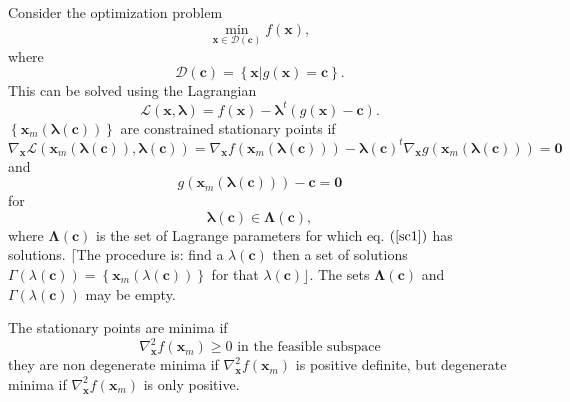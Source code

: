 \documentclass[aps,preprint]{revtex4}%
\begin{document}
Consider the optimization problem
\begin{equation}
\min_{\mathbf{x\in}\mathcal{D}\left(  \mathbf{c}\right)  }f\left(
\mathbf{x}\right)  ,
\end{equation}
where
\begin{equation}
\mathcal{D}\left(  \mathbf{c}\right)  \mathcal{=}\left\{  \mathbf{x}\left\vert
g\left(  \mathbf{x}\right)  =\mathbf{c}\right.  \right\}  .
\end{equation}
This can be solved using the Lagrangian
\begin{equation}
\mathcal{L}\left(  \mathbf{x,\lambda}\right)  =f\left(  \mathbf{x}\right)
-\mathbf{\lambda}^{t}\left(  g\left(  \mathbf{x}\right)  -\mathbf{c}\right)  .
\end{equation}
$\left\{  \mathbf{x}_{m}\left(  \mathbf{\lambda}\left(  \mathbf{c}\right)
\right)  \right\}  $ are constrained stationary points if
\begin{equation}
\nabla_{\mathbf{x}}\mathcal{L}\left(  \mathbf{x}_{m}\left(  \mathbf{\lambda
}\left(  \mathbf{c}\right)  \right)  \mathbf{,\lambda}\left(  \mathbf{c}%
\right)  \right)  =\nabla_{\mathbf{x}}f\left(  \mathbf{x}_{m}\left(
\mathbf{\lambda}\left(  \mathbf{c}\right)  \right)  \right)  -\mathbf{\lambda
}\left(  \mathbf{c}\right)  ^{t}\nabla_{\mathbf{x}}g\left(  \mathbf{x}%
_{m}\left(  \mathbf{\lambda}\left(  \mathbf{c}\right)  \right)  \right)
=\mathbf{0} \label{sc1}%
\end{equation}
and
\begin{equation}
g\left(  \mathbf{x}_{m}\left(  \mathbf{\lambda}\left(  \mathbf{c}\right)
\right)  \right)  -\mathbf{c=0}%
\end{equation}
for
\begin{equation}
\mathbf{\lambda}\left(  \mathbf{c}\right)  \mathbf{\in\Lambda}\left(
\mathbf{c}\right)  ,
\end{equation}
where $\mathbf{\Lambda}\left(  \mathbf{c}\right)  $ is the set of Lagrange
parameters for which eq. $\left(  \ref{sc1}\right)  $ has solutions. $\lceil
$The procedure is: find a $\lambda\left(  \mathbf{c}\right)  $ then a set of
solutions $\Gamma\left(  \lambda\left(  \mathbf{c}\right)  \right)  =\left\{
\mathbf{x}_{m}\left(  \lambda\left(  \mathbf{c}\right)  \right)  \right\}  $
for that $\lambda\left(  \mathbf{c}\right)  \rfloor$. The sets
$\mathbf{\Lambda}\left(  \mathbf{c}\right)  $ and $\Gamma\left(
\lambda\left(  \mathbf{c}\right)  \right)  $ may be empty.

The stationary points are minima if
\begin{equation}
\nabla_{\mathbf{x}}^{2}f\left(  \mathbf{x}_{m}\right)  \geq0\text{ in the
feasible subspace}%
\end{equation}
they are non degenerate minima if $\nabla_{\mathbf{x}}^{2}f\left(
\mathbf{x}_{m}\right)  $ is positive definite, but degenerate minima if
$\nabla_{\mathbf{x}}^{2}f\left(  \mathbf{x}_{m}\right)  $ is only positive.
\end{document}
